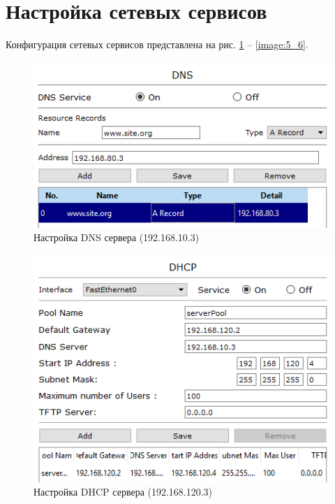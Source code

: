 \section{Настройка сетевых сервисов}

Конфигурация сетевых сервисов представлена на рис. \ref{image:5_1} -- \ref{image:5_6}.

\begin{figure}[h!]
	\centering
	\includegraphics[scale = 0.74]{images/5_1.png}
	\caption{Настройка DNS сервера (192.168.10.3)}
	\label{image:5_1}
\end{figure}

\begin{figure}[h!]
	\centering
	\includegraphics[scale = 0.82]{images/5_2.png}
	\caption{Настройка DHCP сервера (192.168.120.3)}
	\label{image:5_2}
\end{figure}


